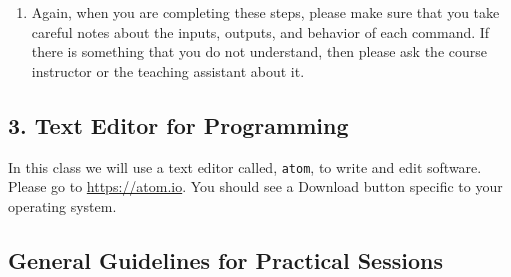 \begin{enumerate}
  \item Again, when you are completing these steps, please make sure that you take careful notes about the inputs,
    outputs, and behavior of each command. If there is something that you do not understand, then please ask the course
    instructor or the teaching assistant about it.

\end{enumerate}


\subsection*{3. Text Editor for Programming}
In this class we will use a text editor called, {\tt atom}, to write and edit software. Please go to \url{https://atom.io}. You should see a Download button specific to your operating system.


\subsection*{General Guidelines for Practical Sessions}

